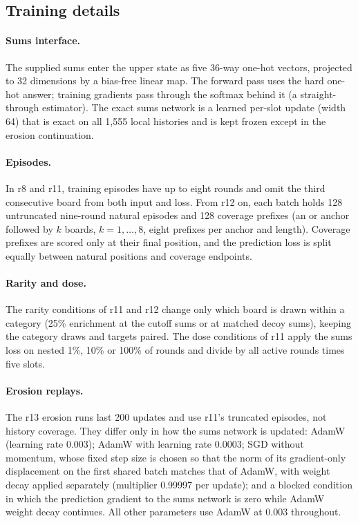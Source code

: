 \subsection{Training details}\label{app:training}

\paragraph{Sums interface.} The supplied sums enter the upper state as five
36-way one-hot vectors, projected to 32 dimensions by a bias-free linear map.
The forward pass uses the hard one-hot answer; training gradients pass
through the softmax behind it (a straight-through estimator). The exact sums
network is a learned per-slot update (width 64) that is exact on all 1,555
local histories and is kept frozen except in the erosion continuation.

\paragraph{Episodes.} In r8 and r11, training episodes have up to eight
rounds and omit the third consecutive \Ncat{} board from both input and loss.
From r12 on, each batch holds 128 untruncated nine-round natural episodes and
128 coverage prefixes (an \Lcat{} or \Hcat{} anchor followed by $k$ \Ncat{}
boards, $k=1,\dots,8$, eight prefixes per anchor and length). Coverage
prefixes are scored only at their final position, and the prediction loss is
split equally between natural positions and coverage endpoints.

\paragraph{Rarity and dose.} The rarity conditions of r11 and r12 change only
which board is drawn within a category (25\% enrichment at the cutoff sums or
at matched decoy sums), keeping the category draws and targets paired. The
dose conditions of r11 apply the sums loss on nested 1\%, 10\% or 100\% of
rounds and divide by all active rounds times five slots.

\paragraph{Erosion replays.} The r13 erosion runs last 200 updates and use
r11's truncated episodes, not history coverage. They differ only in how the
sums network is updated: AdamW (learning rate 0.003); AdamW with learning
rate 0.0003; SGD without momentum, whose fixed step size is chosen so that
the norm of its gradient-only displacement on the first shared batch
matches that of AdamW,
with weight decay applied separately (multiplier 0.99997 per update); and a
blocked condition in which the prediction gradient to the sums network is
zero while AdamW weight decay continues. All other parameters use AdamW at
0.003 throughout.
